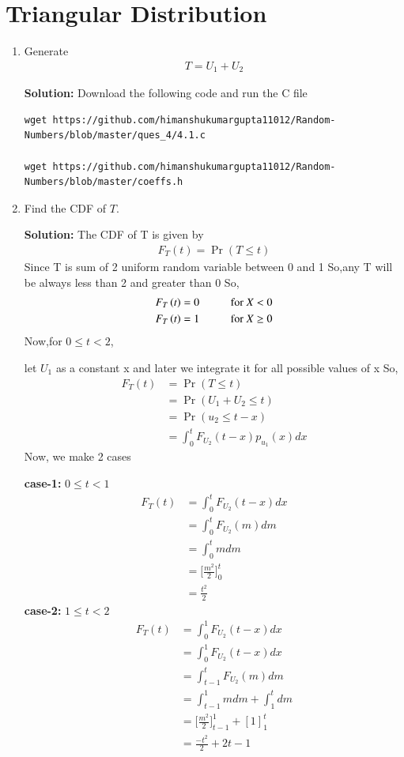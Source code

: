 \documentclass[journal,12pt,twocolumn]{IEEEtran}
\renewcommand\thesection{\arabic{section}}
\providecommand{\pr}[1]{\ensuremath{\Pr\left(#1\right)}}
\providecommand{\brak}[1]{\ensuremath{\left(#1\right)}}
\theoremstyle{remark}
\newcommand{\solution}{\noindent \textbf{Solution: }}
\numberwithin{equation}{section}
\begin{document}
\section{Triangular Distribution}
\begin{enumerate}[label=\thesection.\arabic*
,ref=\thesection.\theenumi]
%
\item Generate 
	\begin{align}
		T = U_1+U_2
	\end{align}

\solution Download the following code and run the C file
\begin{lstlisting}
wget https://github.com/himanshukumargupta11012/Random-Numbers/blob/master/ques_4/4.1.c

wget https://github.com/himanshukumargupta11012/Random-Numbers/blob/master/coeffs.h	
\end{lstlisting}
\item Find the CDF of $T$.

\solution
The CDF of T is given by
\begin{align}
	F_T\brak{t}=\pr{T\leq t}
\end{align}
Since T is sum of 2 uniform random variable between 0 and 1 
So,any T will be always less than 2 and greater than 0
So,
\begin{align}
	F_T\brak{t}=0 \hspace{10mm} \text{for $X<0$}\\
	F_T\brak{t}=1 \hspace{10mm} \text{for $X\geq0$}
\end{align}
Now,for $0\leq t<2$,

let $U_1$ as a constant x and later we integrate it for all possible values of x
So,
\begin{align}
	F_T\brak{t}&=\pr{T\leq t}\\
	&=\pr{U_1+U_2\leq t}\\
&=\pr{u_2\leq t-x}\\
&=\int_0^t F_{U_2}\brak{t-x} p_{u_1}\brak{x}dx
\end{align}
Now, we make 2 cases


\textbf{case-1:} $0\leq t<1$
\begin{align}
	F_T\brak{t}&=\int_0^t F_{U_2}\brak{t-x}dx\\
	&=\int_0^t F_{U_2}\brak{m}dm\\
	&=\int_0^t mdm\\
	&=\bigg[\frac{m^2}{2}\bigg]_0^t\\
	&=\frac{t^2}{2}
\end{align}
\textbf{case-2:} $1\leq t<2$
\begin{align}
	F_T\brak{t}&=\int_0^1 F_{U_2}\brak{t-x}dx\\
	&=\int_0^1 F_{U_2}\brak{t-x}dx\\
	&=\int_{t-1}^t F_{U_2}\brak{m}dm\\
	&=\int_{t-1}^1 mdm+\int_1^t dm\\
	&=\bigg[\frac{m^2}{2}\bigg]_{t-1}^1+[1]_1^t\\
	&=\frac{-t^2}{2}+2t-1	
\end{align}


\end{enumerate}
\end{document}
